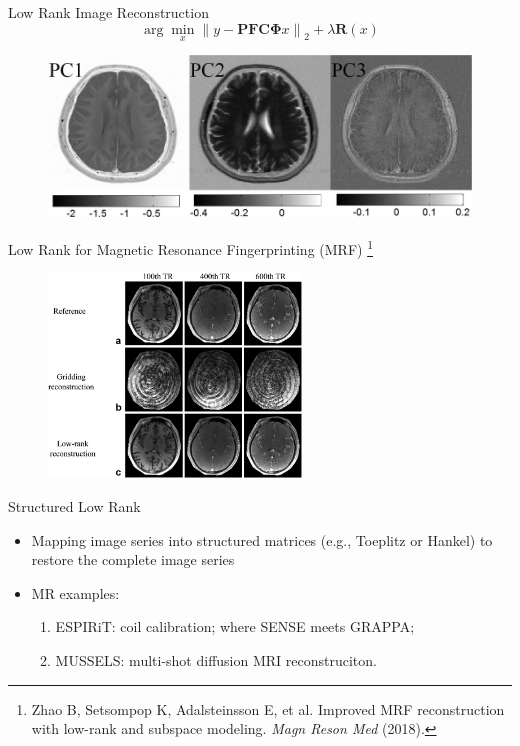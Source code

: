 \documentclass[aspectratio=169]{beamer}
\newcommand*{\norm}[1]{\left\lVert#1\right\rVert}
\newcommand{\argmin}{\arg\!\min}
\begin{document}
	\begin{frame}{Low Rank Image Reconstruction}
		\begin{equation}
			\argmin_x \norm{y - \mathbf{P} \mathbf{F} \mathbf{C} \mathbf{\Phi} x}_2 + \lambda \mathbf{R}(x)
		\end{equation}
		
		\begin{figure}
			\centering
			\includegraphics[width=\textwidth]{figures/mrm23128-fig-0002-m.jpg}
		\end{figure}
	\end{frame}
	
	\begin{frame}{Low Rank for Magnetic Resonance Fingerprinting (MRF) \footnote{Zhao B, Setsompop K, Adalsteinsson E, et al. Improved MRF reconstruction with low-rank and subspace modeling. \textit{Magn Reson Med} (2018).}}
		\begin{figure}
			\centering
			\includegraphics[width=0.6\textwidth]{figures/mrm26701-fig-0002-m.jpg}
		\end{figure}
	\end{frame}
	
	\begin{frame}{Structured Low Rank}
		\begin{itemize}
			\item Mapping image series into structured matrices (e.g., Toeplitz or Hankel) to restore the complete image series
			
			\vspace{1em}
			\item MR examples:
			\vspace{0.5em}
			\begin{enumerate}
				\item ESPIRiT: coil calibration; where SENSE meets GRAPPA;
				\vspace{0.5em}
				\item MUSSELS: multi-shot diffusion MRI reconstruciton.
			\end{enumerate}
		\end{itemize}
	\end{frame}
	
\end{document}
